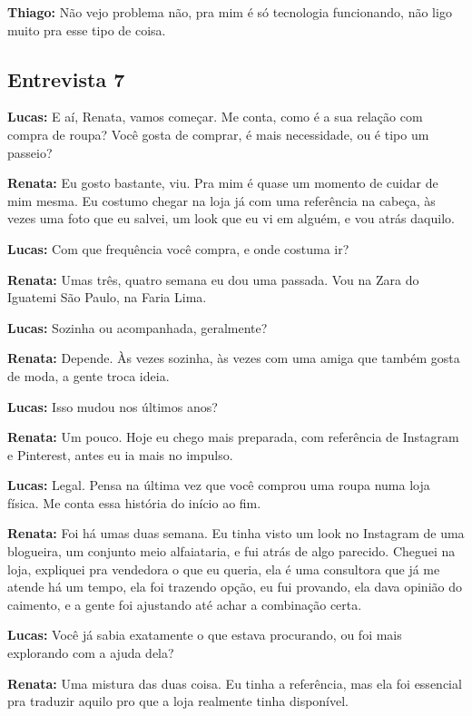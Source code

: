\textbf{Thiago:} Não vejo problema não, pra mim é só tecnologia funcionando, não ligo muito pra esse tipo de coisa.


\subsection*{Entrevista 7}

\textbf{Lucas:} E aí, Renata, vamos começar. Me conta, como é a sua relação com compra de roupa? Você gosta de comprar, é mais necessidade, ou é tipo um passeio?

\textbf{Renata:} Eu gosto bastante, viu. Pra mim é quase um momento de cuidar de mim mesma. Eu costumo chegar na loja já com uma referência na cabeça, às vezes uma foto que eu salvei, um look que eu vi em alguém, e vou atrás daquilo.

\textbf{Lucas:} Com que frequência você compra, e onde costuma ir?

\textbf{Renata:} Umas três, quatro semana eu dou uma passada. Vou na Zara do Iguatemi São Paulo, na Faria Lima.

\textbf{Lucas:} Sozinha ou acompanhada, geralmente?

\textbf{Renata:} Depende. Às vezes sozinha, às vezes com uma amiga que também gosta de moda, a gente troca ideia.

\textbf{Lucas:} Isso mudou nos últimos anos?

\textbf{Renata:} Um pouco. Hoje eu chego mais preparada, com referência de Instagram e Pinterest, antes eu ia mais no impulso.

\textbf{Lucas:} Legal. Pensa na última vez que você comprou uma roupa numa loja física. Me conta essa história do início ao fim.

\textbf{Renata:} Foi há umas duas semana. Eu tinha visto um look no Instagram de uma blogueira, um conjunto meio alfaiataria, e fui atrás de algo parecido. Cheguei na loja, expliquei pra vendedora o que eu queria, ela é uma consultora que já me atende há um tempo, ela foi trazendo opção, eu fui provando, ela dava opinião do caimento, e a gente foi ajustando até achar a combinação certa.

\textbf{Lucas:} Você já sabia exatamente o que estava procurando, ou foi mais explorando com a ajuda dela?

\textbf{Renata:} Uma mistura das duas coisa. Eu tinha a referência, mas ela foi essencial pra traduzir aquilo pro que a loja realmente tinha disponível.


